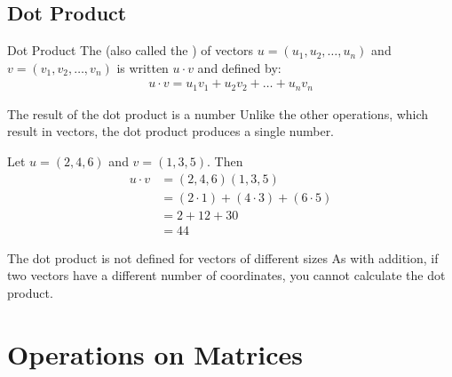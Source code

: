 \documentclass[../notes.tex]{subfiles}
\begin{document}
			\subsection{Dot Product}
				\begin{definition}[width=0.87\textwidth]{Dot Product}
					The  (also called the ) of vectors $u = (u_{1}, u_{2}, \ldots, u_{n})$ and \\$v = (v_{1}, v_{2}, \ldots, v_{n})$ is written $u \cdot v$ and defined by:
					\begin{align*}
						u \cdot v = u_{1}v_{1} + u_{2}v_{2} + \ldots + u_{n}v_{n}
					\end{align*}
				\end{definition}
				\begin{sidenote}{The result of the dot product is a number}
					Unlike the other operations, which result in vectors, the dot product produces a single number.
				\end{sidenote}
				\begin{example}[width=0.6\textwidth]
					Let $u = (2, 4, 6)$ and $v = (1, 3, 5)$. Then
					\begin{align*}
						u \cdot v &= (2, 4, 6)(1, 3, 5)\\
						&= (2 \cdot 1) + (4 \cdot 3) + (6 \cdot 5)\\
						&= 2 + 12 + 30\\
						&= 44
					\end{align*}
				\end{example}
				\begin{sidenote}{The dot product is not defined for vectors of different sizes}
					As with addition, if two vectors have a different number of coordinates, you cannot calculate the dot product.
				\end{sidenote}
		\pagebreak
		\section{Operations on Matrices}
\end{document}
